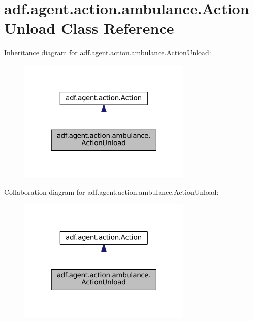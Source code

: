 \hypertarget{classadf_1_1agent_1_1action_1_1ambulance_1_1ActionUnload}{}\section{adf.\+agent.\+action.\+ambulance.\+Action\+Unload Class Reference}
\label{classadf_1_1agent_1_1action_1_1ambulance_1_1ActionUnload}


Inheritance diagram for adf.\+agent.\+action.\+ambulance.\+Action\+Unload\+:
\nopagebreak
\begin{figure}[H]
\begin{center}
\leavevmode
\includegraphics[width=235pt]{classadf_1_1agent_1_1action_1_1ambulance_1_1ActionUnload__inherit__graph}
\end{center}
\end{figure}


Collaboration diagram for adf.\+agent.\+action.\+ambulance.\+Action\+Unload\+:
\nopagebreak
\begin{figure}[H]
\begin{center}
\leavevmode
\includegraphics[width=235pt]{classadf_1_1agent_1_1action_1_1ambulance_1_1ActionUnload__coll__graph}
\end{center}
\end{figure}
